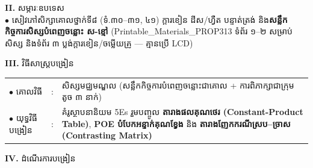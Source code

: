 \documentclass[a4paper,10pt]{article}
\newcommand{\en}[1]{{\TimesEn #1}}
\begin{document}
{\vspace{2pt}

\textbf{II.} {\muol សម្ភារៈឧបទេស}\\[1pt]
\hspace*{0.55cm}$\bullet$ \hspace{0.35cm} សៀវភៅសិក្សាគោលថ្នាក់ទី៨ (ទំ.៣០–៣១, ៤១) ក្ដារខៀន ដីស/ហ្វឺត បន្ទាត់ត្រង់ និង\textbf{សន្លឹកកិច្ចការសិស្សបំពេញចន្លោះ ស-ខ្មៅ} (\en{Printable\_Materials\_PROP313} ទំព័រ ១–២ សម្រាប់សិស្ស និងទំព័រ ៣ ប្លង់ក្ដារខៀន/ចម្លើយគ្រូ — គ្មានប្រើ \en{LCD})

\vspace{2pt}

\textbf{III.} {\muol វិធីសាស្រ្តបង្រៀន}\\[1pt]
\hspace*{0.45cm}%
\begin{tabular}{@{}l l L{14.85cm}@{}}
  $\bullet$ \hspace{0.25cm} គោលវិធី & : & សិស្សមជ្ឈមណ្ឌល (សន្លឹកកិច្ចការបំពេញចន្លោះជាគោល + ការពិភាក្សាជាក្រុមតូច ៣ នាក់) \\
  $\bullet$ \hspace{0.25cm} យុទ្ធវិធីបង្រៀន & : & គំរូស្ថាបនានិយម \en{5Es} រួមបញ្ចូល \textbf{តារាងផលគុណថេរ (\en{Constant-Product Table})}, \textbf{\en{POE} បំបែកអន្ទាក់គុណខ្វែង} និង \textbf{តារាងញែកករណីស្រប–ច្រាស (\en{Contrasting Matrix})} \\
\end{tabular}
}

\vspace{2pt}

\textbf{IV.} {\muol ដំណើរការបង្រៀន}
\end{document}
